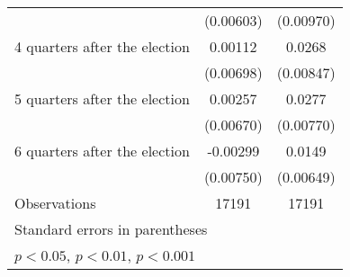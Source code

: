 \begin{table}[htbp]
\begin{tabular}{l*{2}{c}}
                    &   (0.00603)         &   (0.00970)         \\
[1em]
 4 quarters after the election&     0.00112         &      0.0268\sym{**} \\
                    &   (0.00698)         &   (0.00847)         \\
[1em]
 5 quarters after the election&     0.00257         &      0.0277\sym{***}\\
                    &   (0.00670)         &   (0.00770)         \\
[1em]
 6 quarters after the election&    -0.00299         &      0.0149\sym{*}  \\
                    &   (0.00750)         &   (0.00649)         \\
\hline
Observations        &       17191         &       17191         \\
\hline\hline
\multicolumn{3}{l}{\footnotesize Standard errors in parentheses}\\
\multicolumn{3}{l}{\footnotesize \sym{*} \(p<0.05\), \sym{**} \(p<0.01\), \sym{***} \(p<0.001\)}\\
\end{tabular}
\end{table}
